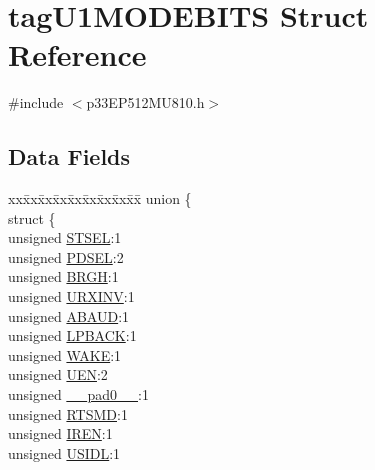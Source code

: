 \hypertarget{structtag_u1_m_o_d_e_b_i_t_s}{}\section{tag\+U1\+M\+O\+D\+E\+B\+I\+TS Struct Reference}
\label{structtag_u1_m_o_d_e_b_i_t_s}


{\ttfamily \#include $<$p33\+E\+P512\+M\+U810.\+h$>$}

\subsection*{Data Fields}
\begin{DoxyCompactItemize}
\item 
\begin{tabbing}
xx\=xx\=xx\=xx\=xx\=xx\=xx\=xx\=xx\=\kill
union \{\\
\>struct \{\\
\>\>unsigned \hyperlink{structtag_u1_m_o_d_e_b_i_t_s_a3d57376019f3ed30d788c5ad72938796}{STSEL}:1\\
\>\>unsigned \hyperlink{structtag_u1_m_o_d_e_b_i_t_s_acc0b2e4d43c615d3c033391b5c4a2d1b}{PDSEL}:2\\
\>\>unsigned \hyperlink{structtag_u1_m_o_d_e_b_i_t_s_a5ac4f749c73f2dfc0f8699b73fe251fc}{BRGH}:1\\
\>\>unsigned \hyperlink{structtag_u1_m_o_d_e_b_i_t_s_ab6387939f9a8bc487f0eab6e20afd53d}{URXINV}:1\\
\>\>unsigned \hyperlink{structtag_u1_m_o_d_e_b_i_t_s_aeb177356d5f30b6f3a28d8d65c4950f5}{ABAUD}:1\\
\>\>unsigned \hyperlink{structtag_u1_m_o_d_e_b_i_t_s_a138f7c04973519ef4dfe9bbc1610cbc0}{LPBACK}:1\\
\>\>unsigned \hyperlink{structtag_u1_m_o_d_e_b_i_t_s_a364c8b1b2c2f66b23dd1093ced3e20dd}{WAKE}:1\\
\>\>unsigned \hyperlink{structtag_u1_m_o_d_e_b_i_t_s_a2c884c6d86506e0a73df50998a97c1f9}{UEN}:2\\
\>\>unsigned \hyperlink{structtag_u1_m_o_d_e_b_i_t_s_adf71f3d8410c1f1dbbc96680a92c49af}{\_\_pad0\_\_}:1\\
\>\>unsigned \hyperlink{structtag_u1_m_o_d_e_b_i_t_s_a76bdbed23aeadbbf3d0d078bc48cc19f}{RTSMD}:1\\
\>\>unsigned \hyperlink{structtag_u1_m_o_d_e_b_i_t_s_a7e60ff69eada9f471fa59afdbaf29e93}{IREN}:1\\
\>\>unsigned \hyperlink{structtag_u1_m_o_d_e_b_i_t_s_a94d25c6c9271a4ab4f450319e34e2a00}{USIDL}:1\\

\end{tabbing}
\end{DoxyCompactItemize}
